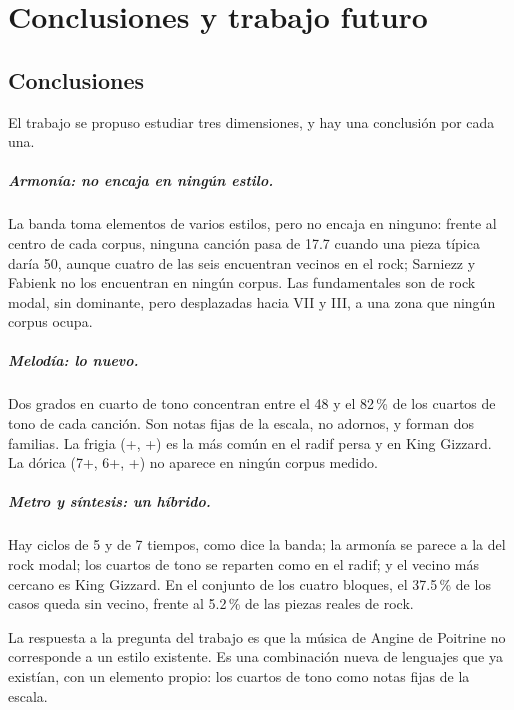 \chapter{Conclusiones y trabajo futuro}\label{cap:conclusiones}

\section{Conclusiones}

El trabajo se propuso estudiar tres dimensiones, y hay una conclusión por cada una.

\paragraph{Armonía: no encaja en ningún estilo.} La banda toma elementos de varios estilos, pero no encaja en ninguno:
frente al centro de cada corpus, ninguna canción pasa de 17.7 cuando una pieza típica daría 50, aunque cuatro de las seis
encuentran vecinos en el rock; Sarniezz y Fabienk no los encuentran en ningún corpus. Las fundamentales son de rock modal, sin dominante, pero desplazadas hacia \fl VII y
\fl III, a una zona que ningún corpus ocupa.

\paragraph{Melodía: lo nuevo.} Dos grados en cuarto de tono concentran entre el 48 y el 82\,\% de los cuartos de tono de
cada canción. Son notas fijas de la escala, no adornos, y forman dos familias. La frigia (+, +) es la más común en
el radif persa y en King Gizzard. La dórica (7+, 6+, +) no aparece en ningún corpus medido.

\paragraph{Metro y síntesis: un híbrido.} Hay ciclos de 5 y de 7 tiempos, como dice la banda; la armonía se parece a la del rock
modal; los cuartos de tono se reparten como en el radif; y el vecino más cercano es King Gizzard. En el conjunto de los cuatro bloques, el 37.5\,\% de los casos
queda sin vecino, frente al 5.2\,\% de las piezas reales de rock.

\medskip
La respuesta a la pregunta del trabajo es que la música de Angine de Poitrine no corresponde a un estilo existente. Es una
combinación nueva de lenguajes que ya existían, con un elemento propio: los cuartos de tono como notas fijas de la escala.

